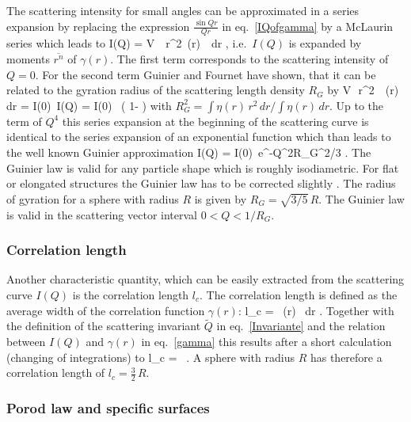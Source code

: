 The scattering intensity for small angles can be approximated in a series expansion
by replacing the expression $\frac{\sin Qr}{Qr}$ in eq.\ \ref{IQofgamma}
by a McLaurin series which leads to
\BE
I(Q) = V\, \pi\, r^2\, \gamma(r)\,
        \, dr
       \quad ,
\EE
i.e.\ $I(Q)$ is expanded by moments $\overline{r^n}$ of $\gamma(r)$.
The first term corresponds to the scattering intensity of $Q=0$.
For the second term Guinier and Fournet \cite{book:Guinier:Fournet}
have shown, that it can be related to the gyration radius of the scattering length density
$R_G$ by
\BE
V\,\pi\, r^2\, \, \gamma(r)\, dr = I(0)\,
     \quad \Rightarrow \quad
   I(Q) = I(0) \, \left( 1- \right)
\EE
with $R_G^2 = \int \eta(r)\, r^2\, dr/\int \eta(r)\, dr$.
Up to the term of $Q^4$ this series expansion at the beginning of the scattering curve
is identical to the series expansion of an exponential function which than leads to
the well known Guinier approximation
\BE
I(Q) = I(0)\, e^{-Q^2R_G^2/3} .
\label{eq:Guinier}
\EE
The Guinier law is valid for any particle shape which is roughly
isodiametric. For flat or elongated structures the Guinier law has to be
corrected slightly \cite{book:Feigin:Svergun,book:Guinier:Fournet}.
The radius of gyration for a sphere with radius $R$ is given by $R_G=\sqrt{3/5}\, R$.
The Guinier law is valid in the scattering vector interval $0<Q<1/R_G$.

\subsubsection{Correlation length}

Another characteristic quantity, which can be easily extracted from
the scattering curve $I(Q)$ is the correlation length $l_c$. The correlation length
is defined as the average width of the correlation function  $\gamma(r)$:
\BE
l_c = \, \int \gamma(r) \, dr .
\label{eq:lc1}
\EE
Together with the definition of the scattering invariant $\tilde Q$ in
eq.\  \ref{Invariante} and the relation between $I(Q)$ and $\gamma(r)$ in
eq.\ \ref{gamma} this results after a short calculation (changing of
integrations) to
\BE
l_c = \pi\,  \quad .
\label{eq:lc2}
\EE
A sphere with radius $R$ has therefore a correlation length of $l_c = \frac{3}{2}\, R$.

\subsubsection{Porod law and specific surfaces}

